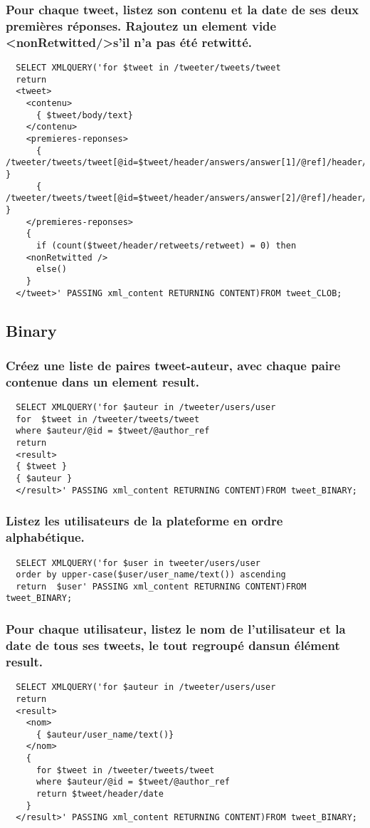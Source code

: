 \subsubsection{Pour chaque tweet, listez son contenu et la date de ses deux premières réponses. Rajoutez un element vide \textless nonRetwitted/\textgreater s’il n’a pas été retwitté.}
\begin{verbatim}
  SELECT XMLQUERY('for $tweet in /tweeter/tweets/tweet
  return
  <tweet>
    <contenu>
      { $tweet/body/text}
    </contenu>
    <premieres-reponses>
      { /tweeter/tweets/tweet[@id=$tweet/header/answers/answer[1]/@ref]/header/date }
      { /tweeter/tweets/tweet[@id=$tweet/header/answers/answer[2]/@ref]/header/date }
    </premieres-reponses>
    {
      if (count($tweet/header/retweets/retweet) = 0) then
	<nonRetwitted />
      else()
    }
  </tweet>' PASSING xml_content RETURNING CONTENT)FROM tweet_CLOB;
\end{verbatim}

\subsection{Binary}
\subsubsection{Créez une liste de paires tweet-auteur, avec chaque paire contenue dans un element result.}
\begin{verbatim}
  SELECT XMLQUERY('for $auteur in /tweeter/users/user 
  for  $tweet in /tweeter/tweets/tweet
  where $auteur/@id = $tweet/@author_ref  
  return
  <result>
  { $tweet }
  { $auteur }
  </result>' PASSING xml_content RETURNING CONTENT)FROM tweet_BINARY;
\end{verbatim}

\subsubsection{Listez les utilisateurs de la plateforme en ordre alphabétique.}
\begin{verbatim}
  SELECT XMLQUERY('for $user in tweeter/users/user
  order by upper-case($user/user_name/text()) ascending
  return  $user' PASSING xml_content RETURNING CONTENT)FROM tweet_BINARY;
\end{verbatim}


\subsubsection{Pour chaque utilisateur, listez le nom de l’utilisateur et la date de tous ses tweets, le tout regroupé dansun élément result.}
\begin{verbatim}
  SELECT XMLQUERY('for $auteur in /tweeter/users/user
  return
  <result>
    <nom>
      { $auteur/user_name/text()}
    </nom> 
    {
      for $tweet in /tweeter/tweets/tweet
      where $auteur/@id = $tweet/@author_ref  
      return $tweet/header/date
    }
  </result>' PASSING xml_content RETURNING CONTENT)FROM tweet_BINARY;
\end{verbatim}


